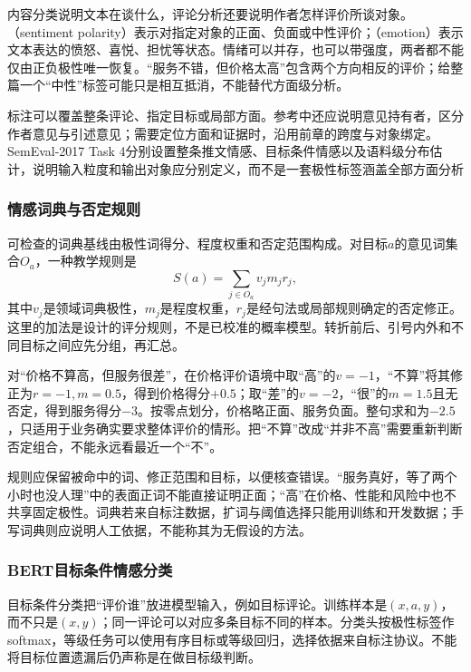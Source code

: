 内容分类说明文本在谈什么，评论分析还要说明作者怎样评价所谈对象。（sentiment polarity）表示对指定对象的正面、负面或中性评价；（emotion）表示文本表达的愤怒、喜悦、担忧等状态。情绪可以并存，也可以带强度，两者都不能仅由正负极性唯一恢复。“服务不错，但价格太高”包含两个方向相反的评价；给整篇一个“中性”标签可能只是相互抵消，不能替代方面级分析。

标注可以覆盖整条评论、指定目标或局部方面。参考中还应说明意见持有者，区分作者意见与引述意见；需要定位方面和证据时，沿用前章的跨度与对象绑定。SemEval-2017 Task 4分别设置整条推文情感、目标条件情感以及语料级分布估计，说明输入粒度和输出对象应分别定义，而不是一套极性标签涵盖全部方面分析

\subsubsection{情感词典与否定规则}
\label{sec:nlp-classification-sentiment-lexicon}

可检查的词典基线由极性词得分、程度权重和否定范围构成。对目标$a$的意见词集合$O_a$，一种教学规则是
\[
  S(a)=\sum_{j\in O_a}v_jm_jr_j,
\]
其中$v_j$是领域词典极性，$m_j$是程度权重，$r_j$是经句法或局部规则确定的否定修正。这里的加法是设计的评分规则，不是已校准的概率模型。转折前后、引号内外和不同目标之间应先分组，再汇总。

对“价格不算高，但服务很差”，在价格评价语境中取“高”的$v=-1$，“不算”将其修正为$r=-1,m=0.5$，得到价格得分$+0.5$；取“差”的$v=-2$，“很”的$m=1.5$且无否定，得到服务得分$-3$。按零点划分，价格略正面、服务负面。整句求和为$-2.5$，只适用于业务确实要求整体评价的情形。把“不算”改成“并非不高”需要重新判断否定组合，不能永远看最近一个“不”。

规则应保留被命中的词、修正范围和目标，以便核查错误。“服务真好，等了两个小时也没人理”中的表面正词不能直接证明正面；“高”在价格、性能和风险中也不共享固定极性。词典若来自标注数据，扩词与阈值选择只能用训练和开发数据；手写词典则应说明人工依据，不能称其为无假设的方法。

\subsubsection{BERT目标条件情感分类}
\label{sec:nlp-classification-sentiment-bert}

目标条件分类把“评价谁”放进模型输入，例如\code{[CLS]}目标\code{[SEP]}评论\code{[SEP]}。训练样本是$(x,a,y)$，而不只是$(x,y)$；同一评论可以对应多条目标不同的样本。分类头按极性标签作softmax，等级任务可以使用有序目标或等级回归，选择依据来自标注协议。不能将目标位置遗漏后仍声称是在做目标级判断。

